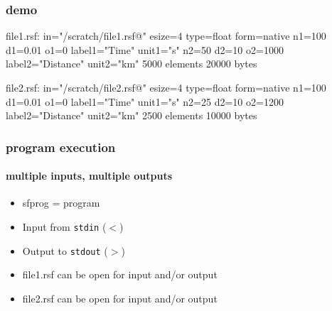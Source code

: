 \begin{frame}[fragile] \frametitle{demo}

  \vfill
  \tiny
\begin{semiverbatim}
file1.rsf:
    in="/scratch/file1.rsf@"
    esize=4 type=float form=native
    n1=100         d1=0.01        o1=0          label1="Time" unit1="s"
    n2=50          d2=10          o2=1000       label2="Distance" unit2="km"
        5000 elements 20000 bytes
\end{semiverbatim}
\normalsize

  \vfill

  \tiny
\begin{semiverbatim}
file2.rsf:
    in="/scratch/file2.rsf@"
    esize=4 type=float form=native
    n1=100         d1=0.01        o1=0          label1="Time" unit1="s"
    n2=25          d2=10          o2=1200       label2="Distance" unit2="km"
        2500 elements 10000 bytes
\end{semiverbatim}
\end{frame}
\cwpnote{}


\begin{frame} \frametitle{program execution}
  \framesubtitle{multiple inputs, multiple outputs}
  

  \begin{itemize}
  \item sfprog = \mg program
  \item Input from \texttt{stdin} ($<$)
  \item Output to \texttt{stdout} ($>$)
  \item file1.rsf can be open for input and/or output
  \item file2.rsf can be open for input and/or output
  \end{itemize}
  
\end{frame}
\cwpnote{}

